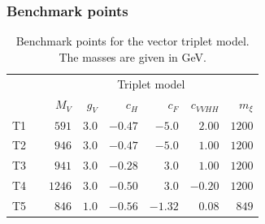 \subsubsection{Benchmark points}

\begin{table}
    \begin{tabular}{c c rrrrrr}
      \toprule
      \multirow{2}{*}{}
      && \multicolumn{6}{c}{Triplet model} \\
      \cmidrule{3-8}
      && $M_V$ & $g_V$ & $c_H$ & ${c}_{F}$ & ${c}_{VVHH}$ & $m_\xi$ \\
      \midrule
      T1 && $591$ & $3.0$ & $-0.47$ & $-5.0$ & $2.00$ & $1200$ \\
      T2 && $946$ & $3.0$ & $-0.47$ & $-5.0$ & $1.00$ & $1200$ \\
      T3 && $941$ & $3.0$ & $-0.28$ & $3.0$ & $1.00$ & $1200$ \\
      T4 && $1246$ & $3.0$ & $-0.50$ & $3.0$ & $-0.20$ & $1200$ \\
      T5 && $846$ & $1.0$ & $-0.56$ & $-1.32$ & $0.08$ & $849$ \\
      \bottomrule
    \end{tabular}
    \caption[Benchmark points for the vector triplet model]{Benchmark points
      for the vector triplet model. The masses are given in GeV.}
  \label{tbl:validity_vector_triplet_benchmarks}
\end{table}

